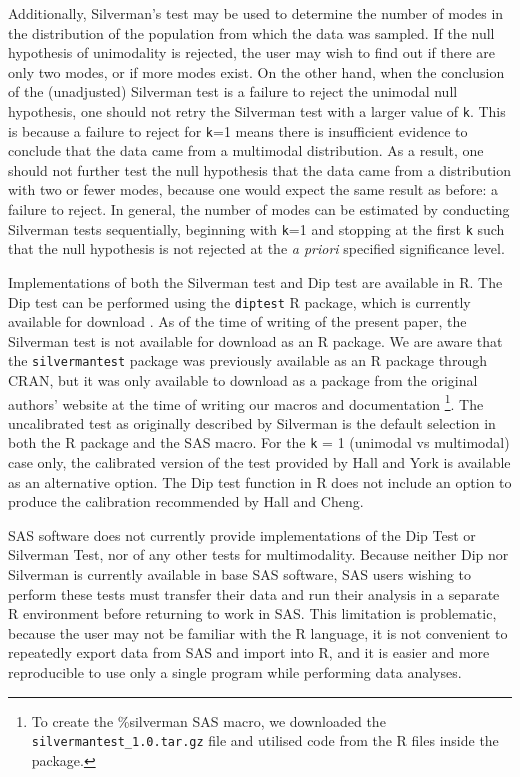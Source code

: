 \documentclass[]{interact}
\theoremstyle{plain}%
\theoremstyle{definition}
\theoremstyle{remark}
\begin{document}
Additionally, Silverman's test may be used to determine the number of modes in the distribution of the population from which the data was sampled. If the null hypothesis of unimodality is rejected, the user may wish to find out if there are only two modes, or if more modes exist. On the other hand, when the conclusion of the (unadjusted) Silverman test is a failure to reject the unimodal null hypothesis, one should not retry the Silverman test with a larger value of \texttt{k}. This is because a failure to reject for \texttt{k}=1 means there is insufficient evidence to conclude that the data came from a multimodal distribution. As a result, one should not further test the null hypothesis that the data came from a distribution with two or fewer modes, because one would expect the same result as before: a failure to reject. 
In general, the number of modes can be estimated by conducting Silverman tests sequentially, beginning with \texttt{k}=1 and stopping at the first \texttt{k} such that the null hypothesis is not rejected at the {{\it a priori}} specified significance level.


Implementations of both the Silverman test and Dip test are available in R. The Dip test can be performed using the \texttt{diptest} R package, which is currently available for download \citep{diptestpackage}. As of the time of writing of the present paper, the Silverman test is not available for download as an R package. We are aware that the \texttt{silvermantest} package was previously available as an R package through CRAN, but it was only available to download as a package from the original authors' website at the time of writing our macros and documentation \citep{silvermanpkg}\footnote{To create the \%silverman SAS macro, we downloaded the \texttt{silvermantest\_1.0.tar.gz} file and utilised code from the R files inside the package.}.  The uncalibrated test as originally described by Silverman \cite{silverman1981using} is the default selection in both the R package and the SAS macro. For the \texttt{k} = 1 (unimodal vs multimodal) case only, the calibrated version of the test provided by Hall and York \cite{hall2001calibration} is available as an alternative option. The Dip test function in R does not include an option to produce the calibration recommended by Hall and Cheng. 

SAS software does not currently provide implementations of the Dip Test or Silverman Test, nor of any other tests for multimodality. Because neither Dip nor Silverman is currently available in base SAS software, SAS users wishing to perform these tests must transfer their data and run their analysis in a separate R environment before returning to work in SAS. This limitation is problematic, because the user may not be familiar with the R language, it is not convenient to repeatedly export data from SAS and import into R, and it is easier and more reproducible to use only a single program while performing data analyses.
\end{document}
